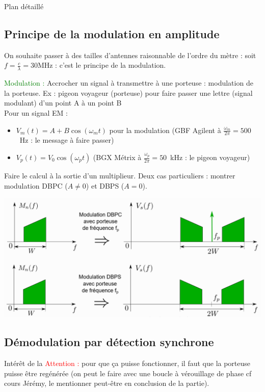 \begin{reportBlock}{Plan détaillé}
\subsection{Principe de la modulation en amplitude}
On souhaite passer à des tailles d'antennes raisonnable de l'ordre du mètre : soit $f=\frac{c}{\lambda}=30$MHz : c'est le principe de la modulation.

\textcolor{green}{Modulation :} Accrocher un signal à transmettre à une porteuse : modulation de la porteuse. Ex : pigeon voyageur (porteuse) pour faire passer une lettre (signal modulant) d'un point A à un point B\\

Pour un signal EM : 
\begin{itemize}
    \item $V_m(t)=A+B\cos(\omega_mt)$ pour la modulation (GBF Agilent à $\frac{\omega_m}{2\pi}=500$~Hz : le message à faire passer)
    \item $V_p(t) = V_0\cos(\omega_pt)$ (BGX Métrix à $\frac{\omega_p}{2\pi}=50$~kHz : le pigeon voyageur)
\end{itemize}

Faire le calcul à la sortie d'un multiplieur. Deux cas particuliers : montrer modulation DBPC ($A\neq0$) et DBPS ($A=0$).

\begin{center}
    \includegraphics[scale=0.5]{LP_TraitementSignal/Modulation.png}
\end{center}



\subsection{Démodulation par détection synchrone}
Intérêt de la 
\textcolor{red}{Attention :} pour que ça puisse fonctionner, il faut que la porteuse puisse être regénérée (on peut le faire avec une boucle à vérouillage de phase cf cours Jérémy, le mentionner peut-être en conclusion de la partie).\\


\end{reportBlock}
